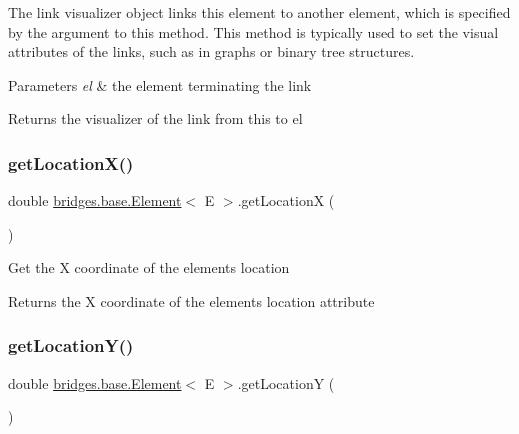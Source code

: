 The link visualizer object links this element to another element, which is specified by the argument to this method. This method is typically used to set the visual attributes of the links, such as in graphs or binary tree structures.


\begin{DoxyParams}{Parameters}
{\em el} & the element terminating the link\\
\hline
\end{DoxyParams}
\begin{DoxyReturn}{Returns}
the visualizer of the link from this to el 
\end{DoxyReturn}
\mbox{\label{classbridges_1_1base_1_1_element_a57cc1611e0d9cbec9da30d1cdcd3b23d}} 
\subsubsection{\texorpdfstring{get\+Location\+X()}{getLocationX()}}
{\footnotesize\ttfamily double \hyperlink{classbridges_1_1base_1_1_element}{bridges.\+base.\+Element}$<$ E $>$.get\+LocationX (\begin{DoxyParamCaption}{ }\end{DoxyParamCaption})}

Get the X coordinate of the element\textquotesingle{}s location \begin{DoxyReturn}{Returns}
the X coordinate of the element\textquotesingle{}s location attribute 
\end{DoxyReturn}
\mbox{\label{classbridges_1_1base_1_1_element_a3cfd6af5ca4cae0596845f62018ce004}} 
\subsubsection{\texorpdfstring{get\+Location\+Y()}{getLocationY()}}
{\footnotesize\ttfamily double \hyperlink{classbridges_1_1base_1_1_element}{bridges.\+base.\+Element}$<$ E $>$.get\+LocationY (\begin{DoxyParamCaption}{ }\end{DoxyParamCaption})}


